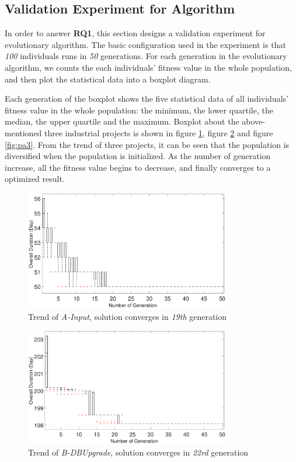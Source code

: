 \subsection{Validation Experiment for Algorithm}
%
In order to answer \textbf{RQ1}, this section designs a validation experiment
for evolutionary algorithm. The basic configuration used in the experiment is
that \emph{100} individuals runs in \emph{50} generations. For each generation
in the evolutionary algorithm, we counts the each individuals' fitness value in
the whole population, and then plot the statistical data into a boxplot diagram.


Each generation of the boxplot shows the five statistical data of all
individuals' fitness value in the whole population: the minimum, the lower
quartile, the median, the upper quartile and the maximum. Boxplot about the
above-mentioned three industrial projects is shown in figure \ref{fig:pa1},
figure \ref{fig:pa2} and figure \ref{fig:pa3}. From the trend of three projects,
it can be seen that the population is diversified when the population is
initialized. As the number of generation increase, all the fitness value begins
to decrease, and finally converges to a optimized result.

\begin{figure}[!htb]
  \centering
  \includegraphics[width=0.8\textwidth]{figures/fig_pa1.eps}
  \caption{Trend of \emph{A-Input}, solution converges in \emph{19th} generation}
  \label{fig:pa1}
\end{figure}

\begin{figure}[!htb]
  \centering
  \includegraphics[width=0.8\textwidth]{figures/fig_pa2.eps}
  \caption{Trend of \emph{B-DBUpgrade}, solution converges in \emph{22rd} generation}
  \label{fig:pa2}
\end{figure}

